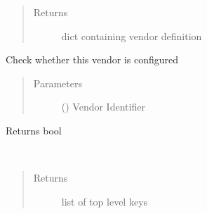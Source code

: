\documentclass[letterpaper,10pt,english]{sphinxmanual}
\begin{document}
\begin{fulllineitems}
\begin{fulllineitems}
\begin{quote}
\begin{description}
\item[{Returns}] \leavevmode
\sphinxAtStartPar
dict containing vendor definition

\end{description}\end{quote}

\end{fulllineitems}


\begin{fulllineitems}
\label{\detokenize{dhcp-option-data-class:bloxone.DHCP_OPTION_DEFS.included}}
\sphinxAtStartPar
Check whether this vendor is configured
\begin{quote}\begin{description}
\item[{Parameters}] \leavevmode
\sphinxAtStartPar
{} () \textendash{} Vendor Identifier

\end{description}\end{quote}

\sphinxAtStartPar
Returns bool

\end{fulllineitems}


\begin{fulllineitems}
\label{\detokenize{dhcp-option-data-class:bloxone.DHCP_OPTION_DEFS.keys}}~\begin{quote}\begin{description}
\item[{Returns}] \leavevmode
\sphinxAtStartPar
list of top level keys

\end{description}\end{quote}

\end{fulllineitems}



\end{fulllineitems}
\end{document}
